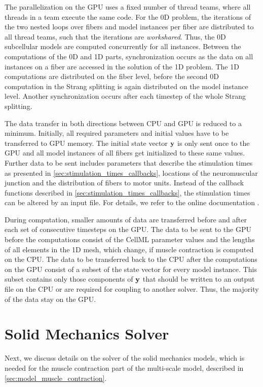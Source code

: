 The parallelization on the GPU uses a fixed number of thread teams, where all threads in a team execute the same code.
For the 0D problem, the iterations of the two nested loops over fibers and model instances per fiber are distributed to all thread teams, such that the iterations are \emph{workshared}. Thus, the 0D subcellular models are computed concurrently for all instances. Between the computations of the 0D and 1D parts, synchronization occurs as the data on all instances on a fiber are accessed in the solution of the 1D problem. The 1D computations are distributed on the fiber level, before the second 0D computation in the Strang splitting is again distributed on the model instance level.
Another synchronization occurs after each timestep of the whole Strang splitting.

The data transfer in both directions between CPU and GPU is reduced to a minimum. Initially, all required parameters and initial values have to be transferred to GPU memory. The initial state vector $\textbf{y}$ is only sent once to the GPU and all model instances of all fibers get initialized to these same values. Further data to be sent includes parameters that describe the stimulation times as presented in \cref{sec:stimulation_times_callbacks}, locations of the neuromuscular junction and the distribution of fibers to motor units. Instead of the callback functions described in \cref{sec:stimulation_times_callbacks}, the stimulation times can be altered by an input file. For details, we refer to the online documentation \cite{opendihuWeb}.

During computation, smaller amounts of data are transferred before and after each set of consecutive timesteps on the GPU. The data to be sent to the GPU before the computations consist of the CellML parameter values and the lengths of all elements in the 1D mesh, which change, if muscle contraction is computed on the CPU. The data to be transferred back to the CPU after the computations on the GPU consist of a subset of the state vector for every model instance. This subset contains only those components of $\textbf{y}$ that should be written to an output file on the CPU or are required for coupling to another solver. Thus, the majority of the data stay on the GPU.


\section{Solid Mechanics Solver}\label{sec:solid_mechanics_solver}
Next, we discuss details on the solver of the solid mechanics models, which is needed for the muscle contraction part of the multi-scale model, described in \cref{sec:model_muscle_contraction}.


